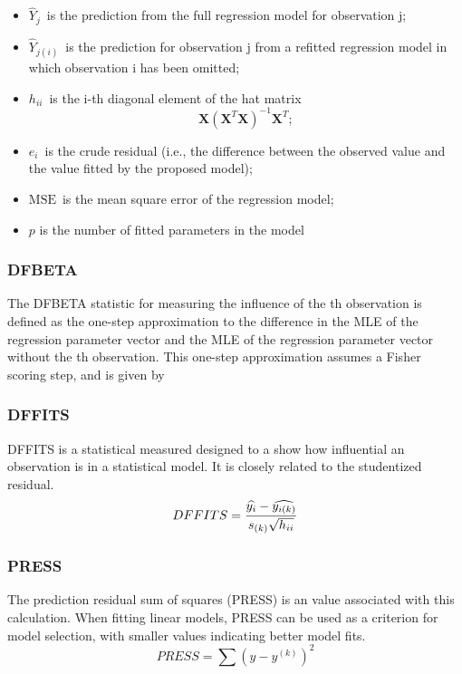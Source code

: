 \documentclass[residuals.tex]{subfiles}
\begin{document}
\begin{itemize}
	\item $\hat Y_j \,$ is the prediction from the full regression model for observation j;
	\item $\hat Y_{j(i)}\,$ is the prediction for observation j from a refitted regression model in which observation i has been omitted;
	\item $h_{ii} \,$ is the i-th diagonal element of the hat matrix 
	\[ \mathbf{X}\left(\mathbf{X}^T\mathbf{X}\right)^{-1}\mathbf{X}^T;\]
	\item $e_i \,$ is the crude residual (i.e., the difference between the observed value and the value fitted by the proposed model);
	\item $\mathrm{MSE} \,$ is the mean square error of the regression model;
	\item $p$ is the number of fitted parameters in the model
\end{itemize}

\subsubsection{DFBETA}

The DFBETA statistic for measuring the influence of 
the th observation is defined as the one-step approximation to 
the difference in the MLE of the regression parameter vector and 
the MLE of the regression parameter vector without the th 
observation. This one-step approximation assumes a Fisher 
scoring step, and is given by



\subsubsection{DFFITS} %
DFFITS is a statistical measured designed to a show how influential an observation is in a statistical model. It is closely related to the studentized residual.
\begin{displaymath} DFFITS = {\widehat{y_i} -
	\widehat{y_{i(k)}} \over s_{(k)} \sqrt{h_{ii}}} \end{displaymath}


\subsubsection{PRESS} %
The prediction residual sum of squares (PRESS) is an value associated with this calculation. When fitting linear models, PRESS can be used as a criterion for model selection, with smaller values indicating better model fits.
\begin{equation}
PRESS = \sum(y-y^{(k)})^2
\end{equation}
\end{document}
